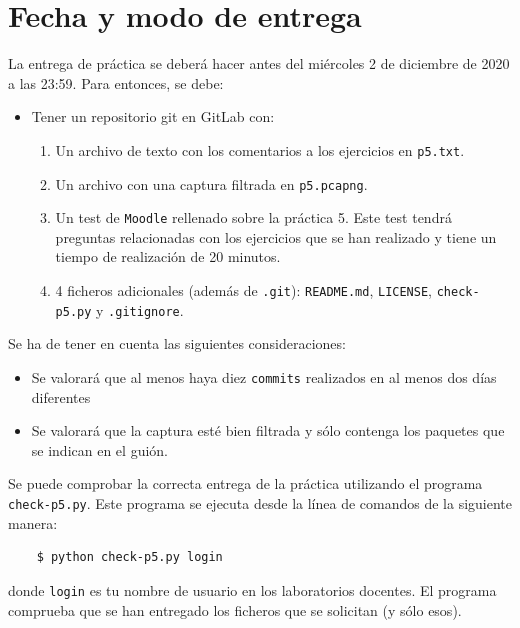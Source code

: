 \documentclass[11pt,a4paper]{article}
\begin{document}
\section{Fecha y modo de entrega}

La entrega de práctica se deberá hacer antes del miércoles 2 de diciembre de 2020 a las 23:59. Para entonces, se debe: 

\begin{itemize}
  \item Tener un repositorio git en GitLab con:
  \begin{enumerate}
    \item Un archivo de texto con los comentarios a los ejercicios en \texttt{p5.txt}.
    \item Un archivo con una captura filtrada en \texttt{p5.pcapng}.
    \item Un test de \texttt{Moodle} rellenado sobre la práctica 5. Este test tendrá preguntas relacionadas con los ejercicios que se han realizado y tiene un tiempo de realización de 20 minutos.
    \item 4 ficheros adicionales (además de \texttt{.git}): \texttt{README.md}, \texttt{LICENSE}, \texttt{check-p5.py} y \texttt{.gitignore}.
  \end{enumerate}
\end{itemize}

Se ha de tener en cuenta las siguientes consideraciones:
\begin{itemize}
  \item Se valorará que al menos haya diez \texttt{commits} realizados en al menos dos días diferentes
  \item Se valorará que la captura esté bien filtrada y sólo contenga los paquetes que se indican en el guión.
\end{itemize}

Se puede comprobar la correcta entrega de la práctica utilizando el programa \texttt{check-p5.py}. Este programa se ejecuta desde la línea de comandos de la siguiente manera:
\begin{verbatim}
	$ python check-p5.py login
\end{verbatim}


donde \texttt{login} es tu nombre de usuario en los laboratorios docentes. El programa comprueba que se han entregado los ficheros que se solicitan (y sólo esos). 



\end{document}
